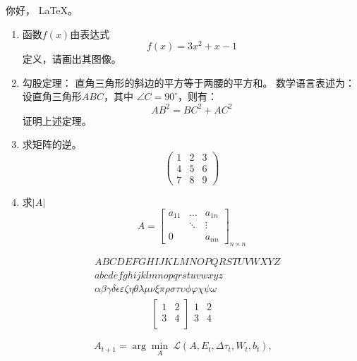 \documentclass[UTF8,a4paper,12pt]{ctexart}
\newcommand{\degree}{^\circ}
\begin{document}
 你好， \LaTeX 。
 
 \begin{enumerate}
 	\item 函数$f(x)$由表达式$$f(x)=3x^2+x-1$$定义，请画出其图像。
 	
 	\item
 	勾股定理：
 	直角三角形的斜边的平方等于两腰的平方和。
 	数学语言表述为：设直角三角形$ABC$，其中 $\angle C=90\degree$，则有：
 	\begin{equation}
 	AB^2 = BC^2 + AC^2	
 	\end{equation}
 	证明上述定理。
 	
 	\item
 	求矩阵的逆。
 	\[
 	\begin{pmatrix}
 	1 & 2 & 3 \\
 	4 & 5 & 6 \\
 	7 & 8 & 9
 	\end{pmatrix}
 	\]
 	
 	\item
 	求$|A|$
 	\[
 	A = \begin{bmatrix}
 	a_{11} & \dots & a_{1n} \\
 	\         & \ddots & \vdots \\
 	0 & & a_{nn}
 	
 	\end{bmatrix}_{n \times n}
 	\]

 \end{enumerate}
 
 \begin{align}
 & ABCDEFGHIJKLMNOPQRSTUVWXYZ \label{eq:alphabet} \\
 & abcdefghijklmnopqrstuvwxyz \\
 & \alpha \beta \gamma \delta \epsilon \varepsilon \zeta \eta \theta \lambda \mu \nu \xi \pi \rho \sigma \tau \upsilon \phi \varphi \chi \psi \omega  
 \end{align}
 \begin{align}
 \begin{bmatrix}
 1 & 2 \\
 3 & 4 \\
 \end{bmatrix}
 \begin{matrix}
 1 & 2 \\
 3 & 4 \\
 \end{matrix}
 \end{align}
 
 \begin{equation}
 A_{t+1} = \arg\min_A \ \mathcal{L}(A,E_t,\Delta\tau_t,W_t,b_t), \nonumber
 \end{equation}
 
\end{document}
